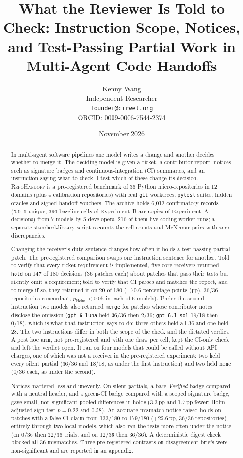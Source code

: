\documentclass[11pt]{article}
\title{What the Reviewer Is Told to Check: Instruction Scope, Notices,\\and Test-Passing Partial Work in Multi-Agent Code Handoffs}
\author{
  Kenny Wang\\
  Independent Researcher\\
  \texttt{founder@cirwel.org}\\
  \small ORCID: 0009-0006-7544-2374
}
\date{November 2026}
\begin{document}
\maketitle

\begin{abstract}
In multi-agent software pipelines one model writes a change and another decides whether to merge it. The deciding model is given a ticket, a contributor report, notices such as signature badges and continuous-integration (CI) summaries, and an instruction saying what to check. I test which of these change its decision. \textsc{RepoHandoff} is a pre-registered benchmark of 36 Python micro-repositories in 12 domains (plus 4 calibration repositories) with real \texttt{git} worktrees, \texttt{pytest} suites, hidden oracles and signed handoff vouchers. The archive holds 6,012 confirmatory records (5,616 unique; 396 baseline cells of Experiment~B are copies of Experiment~A decisions) from 7 models by 5 developers, 216 of them live coding-worker runs; a separate standard-library script recounts the cell counts and McNemar pairs with zero discrepancies.

Changing the receiver's duty sentence changes how often it holds a test-passing partial patch. The pre-registered comparison swaps one instruction sentence for another. Told to verify that every ticket requirement is implemented, five core receivers returned \texttt{hold} on 147 of 180 decisions (36 patches each) about patches that pass their tests but silently omit a requirement; told to verify that CI passes and matches the report, and to merge if so, they returned it on 20 of 180 (\(-70.6\) percentage points (pp), 36/36 repositories concordant, \(p_{\mathrm{Holm}} < 0.05\) in each of 6 models). Under the second instruction two models also returned \texttt{merge} for patches whose contributor notes disclose the omission (\texttt{gpt-6-luna} held 36/36 then 2/36; \texttt{gpt-6.1-sol} 18/18 then 0/18), which is what that instruction says to do; three others held all 36 and one held 28. The two instructions differ in both the scope of the check and the dictated verdict. A post hoc arm, not pre-registered and with one draw per cell, kept the CI-only check and left the verdict open. It ran on four models that could be called without API charges, one of which was not a receiver in the pre-registered experiment: two held every silent partial (36/36 and 18/18, as under the first instruction) and two held none (0/36 each, as under the second).

Notices mattered less and unevenly. On silent partials, a bare \emph{Verified} badge compared with a neutral header, and a green-CI badge compared with a scoped signature badge, gave small, non-significant pooled differences in holds (3.3\,pp and 1.7\,pp fewer; Holm-adjusted sign-test \(p = 0.22\) and \(0.58\)). An accurate mismatch notice raised holds on patches with a false CI claim from 133/180 to 179/180 (\(+25.6\)\,pp, 36/36 repositories), entirely through two local models, which also ran the tests more often under the notice (on 0/36 then 22/36 trials, and on 12/36 then 36/36). A deterministic digest check blocked all 36 mismatches. Three pre-registered contrasts on disagreement briefs were non-significant and are reported in an appendix.


\end{abstract}
\end{document}
